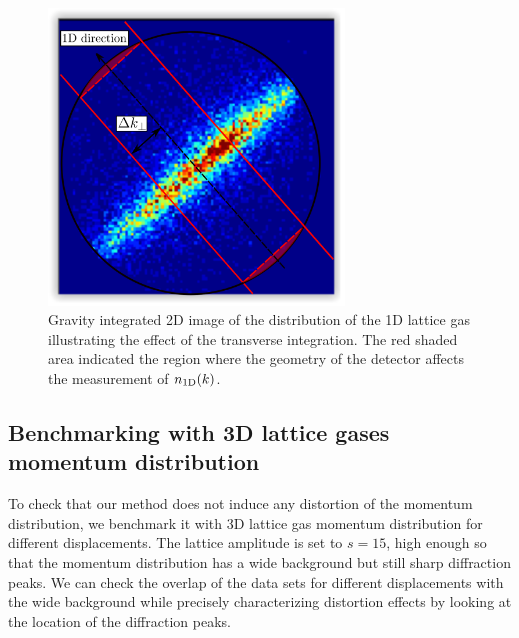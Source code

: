 \begin{figure}
    \centering
    \includegraphics[width=0.7\textwidth]{Fig/Chapter5/1D_transverse_integration.png}
    \caption[Effect of the transverse integration of 1D gases data]{Gravity integrated 2D image of the distribution of the 1D lattice gas illustrating the effect of the transverse integration. The red shaded area indicated the region where the geometry of the detector affects the measurement of $n_{\rm{1D}} (k)$.}
    \label{fig:1D_integration}
\end{figure}

\subsection{Benchmarking with 3D lattice gases momentum distribution}

To check that our method does not induce any distortion of the momentum distribution, we benchmark it with 3D lattice gas momentum distribution for different displacements. The lattice amplitude is set to $s=15$, \ie high enough so that the momentum distribution has a wide background but still sharp diffraction peaks. We can check the overlap of the data sets for different displacements with the wide background while precisely characterizing distortion effects by looking at the location of the diffraction peaks.

